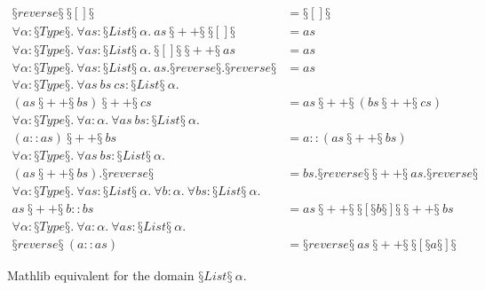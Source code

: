 \begin{conjectureset}[H]
\begin{align}
§reverse§\ §[]§ &= §[]§ \\
\forall \alpha : §Type§.\ \forall as : §List§\ \alpha.\ as\ §++§\ §[]§ &= as \\
\forall \alpha : §Type§.\ \forall as : §List§\ \alpha.\ §[]§\ §++§\ as &= as \\
\forall \alpha : §Type§.\ \forall as : §List§\ \alpha.\ as.§reverse§.§reverse§ &= as \\
\forall \alpha : §Type§.\ \forall as\ bs\ cs : §List§\ \alpha.\ \nonumber \\
  (as\ §++§\ bs)\ §++§\ cs &= as\ §++§\ (bs\ §++§\ cs) \\
\forall \alpha : §Type§.\ \forall a : \alpha.\ \forall as\ bs : §List§\ \alpha.\ \nonumber \\
  (a::as)\ §++§\ bs &= a::(as\ §++§\ bs) \\
\forall \alpha : §Type§.\ \forall as\ bs : §List§\ \alpha.\ \nonumber \\
  (as\ §++§\ bs).§reverse§ &= bs.§reverse§\ §++§\ as.§reverse§ \\
\forall \alpha : §Type§.\ \forall as : §List§\ \alpha.\ \forall b : \alpha.\ \forall bs : §List§\ \alpha.\ \nonumber \\
  as\ §++§\ b :: bs &= as\ §++§\ §[§b§]§\ §++§\ bs \\
\forall \alpha : §Type§.\ \forall a : \alpha.\ \forall as : §List§\ \alpha.\ \nonumber \\
  §reverse§\ (a :: as) &= §reverse§\ as\ §++§\ §[§a§]§
\end{align}
\vspace{-0.9cm}
\caption{Mathlib equivalent for the domain $§List§\ \alpha$.}\label{eqs:mathlib_polymorphic}
\end{conjectureset}
